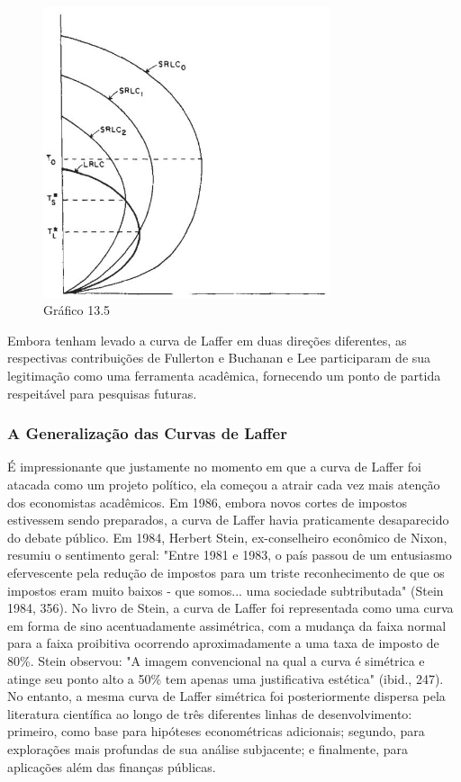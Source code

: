\documentclass[12pt]{article}
\begin{document}
    \begin{figure}[H]
    \centering
    \caption{Gráfico 13.5}
    \includegraphics[width=0.75\textwidth]{4º Período/História do Pensamento Econômico/Tradução HPE/Tradução Tópico 9.3/figura 5.png}
    \end{figure}

Embora tenham levado a curva de Laffer em duas direções diferentes, as respectivas contribuições de Fullerton e Buchanan e Lee participaram de sua legitimação como uma ferramenta acadêmica, fornecendo um ponto de partida respeitável para pesquisas futuras.

\subsubsection{\textbf{A Generalização das Curvas de Laffer}}

É impressionante que justamente no momento em que a curva de Laffer foi atacada como um projeto político, ela começou a atrair cada vez mais atenção dos economistas acadêmicos. Em 1986, embora novos cortes de impostos estivessem sendo preparados, a curva de Laffer havia praticamente desaparecido do debate público. Em 1984, Herbert Stein, ex-conselheiro econômico de Nixon, resumiu o sentimento geral: "Entre 1981 e 1983, o país passou de um entusiasmo efervescente pela redução de impostos para um triste reconhecimento de que os impostos eram muito baixos - que somos... uma sociedade subtributada" (Stein 1984, 356). No livro de Stein, a curva de Laffer foi representada como uma curva em forma de sino acentuadamente assimétrica, com a mudança da faixa normal para a faixa proibitiva ocorrendo aproximadamente a uma taxa de imposto de 80\%. Stein observou: "A imagem convencional na qual a curva é simétrica e atinge seu ponto alto a 50\% tem apenas uma justificativa estética" (ibid., 247). No entanto, a mesma curva de Laffer simétrica foi posteriormente dispersa pela literatura científica ao longo de três diferentes linhas de desenvolvimento: primeiro, como base para hipóteses econométricas adicionais; segundo, para explorações mais profundas de sua análise subjacente; e finalmente, para aplicações além das finanças públicas.
\end{document}
